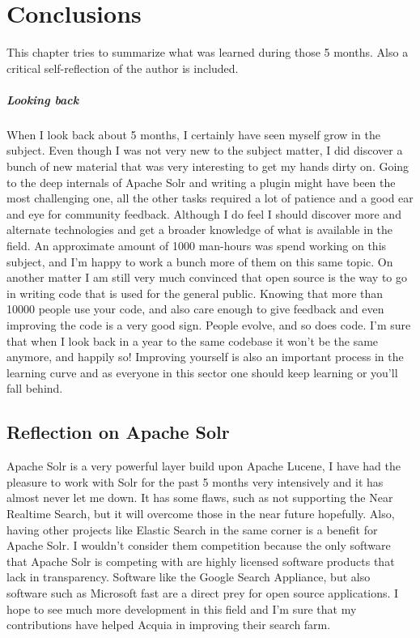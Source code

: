 \chapter{Conclusions}
This chapter tries to summarize what was learned during those 5 months. Also a critical self-reflection of the author is included.

\paragraph{Looking back}
When I look back about 5 months, I certainly have seen myself grow in the subject. Even though I was not very new to the subject matter, I did discover a bunch of new material that was very interesting to get my hands dirty on. Going to the deep internals of Apache Solr and writing a plugin might have been the most challenging one, all the other tasks required a lot of patience and a good ear and eye for community feedback. Although I do feel I should discover more and alternate technologies and get a broader knowledge of what is available in the field.
An approximate amount of 1000 man-hours was spend working on this subject, and I'm happy to work a bunch more of them on this same topic. 
On another matter I am still very much convinced that open source is the way to go in writing code that is used for the general public. Knowing that more than 10000 people use your code, and also care enough to give feedback and even improving the code is a very good sign. People evolve, and so does code. I'm sure that when I look back in a  year to the same codebase it won't be the same anymore, and happily so! Improving yourself is also an important process in the learning curve and as everyone in this sector one should keep learning or you'll fall behind. 

\section{Reflection on Apache Solr}
Apache Solr is a very powerful layer build upon Apache Lucene, I have had the pleasure to work with Solr for the past 5 months very intensively and it has almost never let me down. It has some flaws, such as not supporting the Near Realtime Search, but it will overcome those in the near future hopefully. Also, having other projects like Elastic Search in the same corner is a benefit for Apache Solr. I wouldn't consider them competition because the only software that Apache Solr is competing with are highly licensed software products that lack in transparency. Software like the Google Search Appliance, but also software such as Microsoft fast are a direct prey for open source applications. 
I hope to see much more development in this field and I'm sure that my contributions have helped Acquia in improving their search farm.

